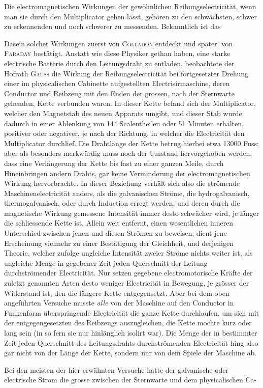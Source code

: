 Die electromagnetischen Wirkungen der gewöhnlichen Reibungselectricität, wenn man sie durch den Multiplicator gehen lässt, gehören zu den schwächsten, schwer zu erkennenden und noch schwerer zu messenden. Bekanntlich ist das
\par\clearpage
{}
\noindent Dasein solcher Wirkungen zuerst von \textsc{Colladon} entdeckt und später. von \textsc{Faraday} bestätigt. Anstatt wie diese Physiker gethan haben, eine starke electrische Batterie durch den Leitungsdraht zu entladen, beobachtete der Hofrath \textsc{Gauss} die Wirkung der Reibungselectricität bei fortgesetzter Drehung einer im physicalischen Cabinette aufgestellten Electrisirmaschine, deren Conductor und Reibzeug mit den Enden der grossen, nach der Sternwarte gehenden, Kette verbunden waren. In dieser Kette befand sich der Multiplicator, welcher den Magnetstab des neuen Apparats umgibt, und dieser Stab wurde dadurch in einer Ablenkung von 144 Scalentheilen oder 51 Minuten erhalten, positiver oder negativer, je nach der Richtung, in welcher die Electricität den Multiplicator durchlief. Die Drahtlänge der Kette betrug hierbei etwa 13000 Fuss; aber als besonders merkwürdig muss noch der Umstand hervorgehoben werden, dass eine Verlängerung der Kette bis fast zu einer ganzen Meile, durch Hineinbringen andern Drahts, gar keine Verminderung der electromagnetischen Wirkung hervorbrachte. In dieser Beziehung verhält sich also die strömende Maschinenelectricität anders, als die galvanischen Ströme, die hydrogalvanisch, thermogalvanisch, oder durch Induction erregt werden, und deren durch die magnetische Wirkung gemessene Intensität immer desto schwächer wird, je länger die schliessende Kette ist. Allein weit entfernt, einen wesentlichen inneren Unterschied zwischen jenen und diesen Strömen zu beweisen, dient jene Erscheinung vielmehr zu einer Bestätigung der Gleichheit, und derjenigen Theorie, welcher zufolge ungleiche Intensität zweier Ströme nichts weiter ist, als ungleiche Menge in gegebener Zeit jeden Querschnitt der Leitung durchströmender Electricität. Nur setzen gegebene electromotorische Kräfte der zuletzt genannten Arten desto weniger Electricität in Bewegung, je grösser der Widerstand ist, den die längere Kette entgegensetzt. Aber bei dem oben angeführten Versuche musste \textit{alle} von der Maschine auf den Conductor in Funkenform überspringende Electricität die ganze Kette durchlaufen, um sich mit der entgegengesetzten des Reibzeugs auszugleichen, die Kette mochte kurz oder lang sein (in so fern sie nur hinlänglich isolirt war). Die Menge der in bestimmter Zeit jeden Querschnitt des Leitungsdrahts durchströmenden Electricität hing also gar nicht von der Länge der Kette, sondern nur von dem Spiele der Maschine ab.

Bei den meisten der hier erwähnten Versuche hatte der galvanische oder electrische Strom die grosse zwischen der Sternwarte und dem physicalischen Ca-
\par\GaussVSourceGathering{45\textsuperscript{*}}
